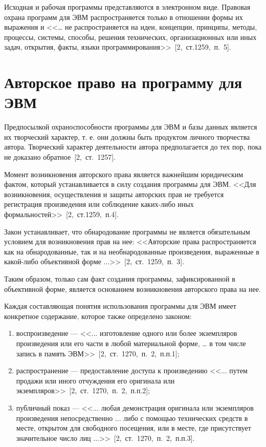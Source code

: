 Исходная и рабочая программы представляются в электронном виде.
Правовая охрана программ для ЭВМ распространяется только в отношении формы их выражения и <<… не распространяется
на идеи, концепции, принципы, методы, процессы, системы, способы, решения технических, организационных или иных
задач, открытия, факты, языки программирования>>~[2,~ст.1259,~п.~5].

\section{Авторское право на программу для ЭВМ}

Предпосылкой охраноспособности программы для ЭВМ и базы данных является их творческий характер, т. е. они
должны быть продуктом личного творчества автора. Творческий характер деятельности автора предполагается до
тех пор, пока не доказано обратное~[2,~ст.~1257].

Момент возникновения авторского права является важнейшим юридическим фактом, который устанавливается в силу
создания программы для ЭВМ. <<Для возникновения, осуществления и защиты авторских прав не требуется регистрация
произведения или соблюдение каких-либо иных формальностей>>~[2,~ст.1259,~п.4].

Закон устанавливает, что обнародование программы не является обязательным условием для возникновения прав на нее:
<<Авторские права распространяется как на обнародованные, так и на необнародованные произведения, выраженные в
какой-либо объективной форме ...>>~[2,~ст.~1259,~п.~3].

Таким образом, только сам факт создания программы, зафиксированной в объективной форме, является основанием
возникновения авторского права на нее.

Каждая составляющая понятия использования программы для ЭВМ имеет конкретное содержание, которое также
определено законом:
\begin{enumerate}
\item воспроизведение --- <<... изготовление одного или более экземпляров произведения или его части
в любой материальной форме, … в том числе запись в память ЭВМ>>~[2,~ст.~1270,~п.~2,~п.п.1];
\item распространение –-- предоставление доступа к произведению <<... путем продажи или иного отчуждения его
оригинала или экземпляров>>~[2,~ст.~1270,~п.~2,~п.п.2];
\item публичный показ --- <<... любая демонстрация оригинала или экземпляров произведения непосредственно ...
либо с помощью технических средств в месте, открытом для свободного посещения, или в месте, где присутствует
значительное число лиц ...>>~[2,~ст.~1270,~п.~2,~п.п.3].
\end{enumerate}

